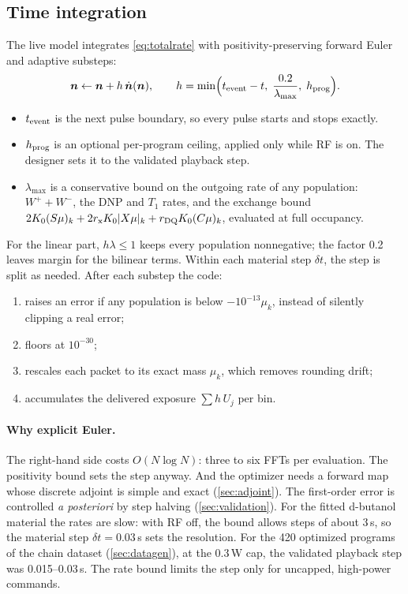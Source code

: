 \documentclass[11pt]{article}
\begin{document}
\subsection{Time integration}
\label{sec:integration}

The live model integrates \cref{eq:totalrate} with positivity-preserving forward Euler and
adaptive substeps:
\begin{equation}
\bm n\leftarrow \bm n+h\,\dot{\bm n}(\bm n),\qquad
h=\min\Bigl(t_{\rm event}-t,\;\frac{0.2}{\lambda_{\max}},\;h_{\rm prog}\Bigr).
\label{eq:euler}
\end{equation}
\begin{itemize}
\item \(t_{\rm event}\) is the next pulse boundary, so every pulse starts and stops exactly.
\item \(h_{\rm prog}\) is an optional per-program ceiling, applied only while RF is on. The
designer sets it to the validated playback step.
\item \(\lambda_{\max}\) is a conservative bound on the outgoing rate of any population:
\(W^++W^-\), the DNP and \(T_1\) rates, and the exchange bound
\(2K_0(S\mu)_k+2r_{\rm x}K_0|X\mu|_k+r_{\rm DQ}K_0(C\mu)_k\), evaluated at full occupancy.
\end{itemize}
For the linear part, \(h\lambda\le1\) keeps every population nonnegative; the factor 0.2 leaves
margin for the bilinear terms. Within each material step \(\delta t\), the step is split as
needed. After each substep the code:
\begin{enumerate}
\item raises an error if any population is below \(-10^{-13}\mu_k\), instead of silently
clipping a real error;
\item floors at \(10^{-30}\);
\item rescales each packet to its exact mass \(\mu_k\), which removes rounding drift;
\item accumulates the delivered exposure \(\sum h\,U_j\) per bin.
\end{enumerate}

\paragraph{Why explicit Euler.} The right-hand side costs \(O(N\log N)\): three to six FFTs per
evaluation. The positivity bound sets the step anyway. And the optimizer needs a forward map whose
discrete adjoint is simple and exact (\cref{sec:adjoint}). The first-order error is controlled
\emph{a posteriori} by step halving (\cref{sec:validation}). For the fitted d-butanol material the rates are slow: with RF off, the bound allows steps of
about 3\,s, so the material step \(\delta t=0.03\)\,s sets the resolution. For the 420 optimized
programs of the chain dataset (\cref{sec:datagen}), at the 0.3\,W cap, the validated playback
step was 0.015--0.03\,s. The rate bound limits the step only for uncapped, high-power commands.
\end{document}
